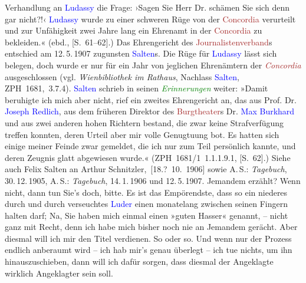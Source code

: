 {{{                     Verhandlung an \textcolor{blue}{Ludassy} die Frage: ›Sagen
                     Sie Herr Dr. schämen Sie sich denn gar nicht?!‹ \textcolor{blue}{Ludassy} wurde zu einer schweren Rüge von der \textcolor{brown}{Concordia} verurteilt und zur Unfähigkeit
                     zwei Jahre lang ein Ehrenamt in der \textcolor{brown}{Concordia} zu bekleiden.« (ebd., [S. 61–62].) Das Ehrengericht des
                     \textcolor{brown}{Journalistenverband}s
                  entschied am 12. 5. 1907 zugunsten \textcolor{blue}{Salten}s.
                  Die Rüge für \textcolor{blue}{Ludassy} lässt sich belegen,
                  doch wurde er nur für ein Jahr von jeglichen Ehrenämtern der \emph{\textcolor{brown}{Concordia}} ausgeschlossen (vgl.
                        \emph{Wienbibliothek im Rathaus}, Nachlass \textcolor{blue}{Salten}, ZPH 1681, 3.7.4). \textcolor{blue}{Salten} schrieb in seinen \emph{\textcolor{green}{Erinnerungen}} weiter: »Damit beruhigte ich mich aber nicht, rief
                     ein zweites Ehrengericht an, das aus Prof. Dr. \textcolor{blue}{Joseph Redlich}, aus dem früheren Direktor des \textcolor{brown}{Burgtheater}s Dr. \textcolor{blue}{Max Burkhard} und aus zwei anderen hohen Richtern
                     bestand, die zwar keine Strafverfügung treffen konnten, deren Urteil aber mir
                     volle Genugtuung bot. Es hatten sich einige meiner Feinde zwar gemeldet, die
                     ich nur zum Teil persönlich kannte, und deren Zeugnis glatt abgewiesen
                     wurde.« (ZPH 1681/1 1.1.1.9.1, [S. 62].) Siehe auch Felix Salten an Arthur Schnitzler, [18.? 10. 1906] sowie A. S.: \emph{Tagebuch}, 30. 12. 1905, A. S.: \emph{Tagebuch}, 14. 1. 1906 und 12. 5. 1907.}}}\label{K_L03415-6h}
               Jemandem erzählt? Wenn nicht, dann tun Sie’s doch, bitte. Es ist das Empörendste,
               dass so ein niederes {\pb}durch und
               durch verseuchtes \textcolor{blue}{Luder}{}\ledrightnote{{$\rightarrow$}\textcolor{blue}{Julius von Gans-Ludassy}}
               einen monatelang zwischen seinen Fingern halten darf; Na, Sie haben mich einmal einen
               »guten Hasser« genannt, – nicht ganz mit Recht, denn ich habe mich bisher noch nie an
               Jemandem gerächt. Aber diesmal will ich mir den Titel verdienen. So oder so. Und wenn
               nur der Prozess endlich anberaumt wird – ich hab mir’s genau überlegt – ich tue
               nichts, um ihn hinauszuschieben, dann will ich dafür sorgen, dass diesmal der
               Angeklagte wirklich Angeklagter sein soll.\pend
           
